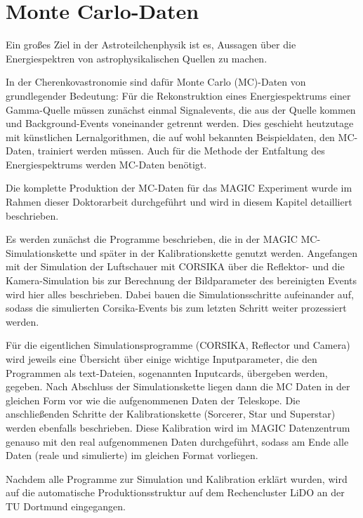 \chapter{Monte Carlo-Daten}

Ein großes Ziel in der Astroteilchenphysik ist es, Aussagen über die Energiespektren von astrophysikalischen Quellen zu machen.

In der Cherenkovastronomie sind dafür Monte Carlo (MC)-Daten von grundlegender Bedeutung:
Für die Rekonstruktion eines Energiespektrums einer Gamma-Quelle müssen zunächst einmal Signalevents, die aus der Quelle kommen und Background-Events voneinander getrennt werden.
Dies geschieht heutzutage mit künstlichen Lernalgorithmen, die auf wohl bekannten Beispieldaten, den MC-Daten, trainiert werden müssen.
Auch für die Methode der Entfaltung des Energiespektrums werden MC-Daten benötigt.

Die komplette Produktion der MC-Daten für das MAGIC Experiment wurde im Rahmen dieser Doktorarbeit durchgeführt und wird in diesem Kapitel detailliert beschrieben.

Es werden zunächst die Programme beschrieben, die in der MAGIC MC-Simulationskette und später in der Kalibrationskette genutzt werden.
Angefangen mit der Simulation der Luftschauer mit CORSIKA über die Reflektor- und die Kamera-Simulation bis zur Berechnung der Bildparameter des bereinigten Events wird hier alles beschrieben.
Dabei bauen die Simulationsschritte aufeinander auf, sodass die simulierten Corsika-Events bis zum letzten Schritt weiter prozessiert werden.

Für die eigentlichen Simulationsprogramme (CORSIKA, Reflector und Camera) wird jeweils eine Übersicht über einige wichtige Inputparameter, die den Programmen als text-Dateien,
sogenannten Inputcards, übergeben werden, gegeben.
Nach Abschluss der Simulationskette liegen dann die MC Daten in der gleichen Form vor wie die aufgenommenen Daten der Teleskope. 
Die anschließenden Schritte der Kalibrationskette (Sorcerer, Star und Superstar) werden ebenfalls beschrieben.
Diese Kalibration wird im MAGIC Datenzentrum genauso mit den real aufgenommenen Daten durchgeführt, sodass am Ende alle Daten (reale und simulierte) im gleichen Format vorliegen.

Nachdem alle Programme zur Simulation und Kalibration erklärt wurden, wird auf die automatische Produktionsstruktur auf dem Rechencluster LiDO an der TU Dortmund eingegangen.

